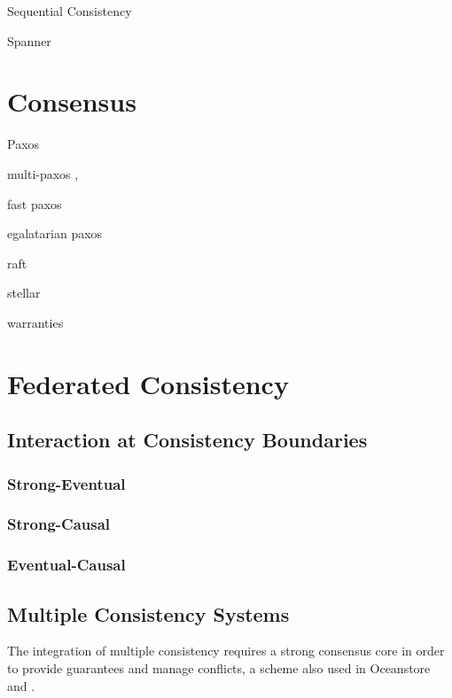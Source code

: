 \documentclass[letterpaper,twocolumn,10pt]{article}
\begin{document}
Sequential Consistency \cite{attiya_sequential_1994}

Spanner \cite{corbett_spanner_2013}

\section{Consensus}

Paxos \cite{lamport_paxos_2001}

multi-paxos \cite{chandra_paxos_2007},

fast paxos \cite{lamport_fast_2006}

egalatarian paxos \cite{moraru_there_2013,moraru_egalitarian_2012}

raft \cite{ongaro_search_2013,howard_raft_2015}

stellar \cite{mazieres_stellar_2015}

warranties \cite{liu_warranties_2014}

\section{Federated Consistency}

\subsection{Interaction at Consistency Boundaries}

\subsubsection{Strong-Eventual}

\subsubsection{Strong-Causal}

\subsubsection{Eventual-Causal}

\subsection{Multiple Consistency Systems}

The integration of multiple consistency requires a strong consensus core in order to provide guarantees and manage conflicts, a scheme also used in Oceanstore \cite{kubiatowicz_oceanstore_2000} and \cite{gray_dangers_1996}.
\end{document}

